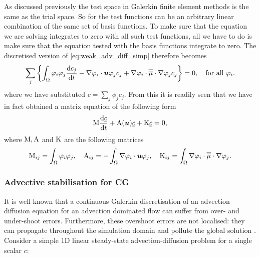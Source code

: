 As discussed previously the test space in Galerkin finite element methods is the same as the
trial space. So for \PN the test functions can be an arbitrary linear combination
of the same set of basis functions. To make sure that the equation we are solving
integrates to zero with all such test functions, all we have to do is make sure
that the equation tested with the basis functions integrate to zero. The discretised
version of \eqref{eq:weak_adv_diff_simp} therefore becomes
\begin{equation}
  \sum_j \left\{ \int_\Omega \varphi_i \varphi_j  \frac{\mathrm{d} c_j}{\mathrm{d} t} -
    \nabla\varphi_i\cdot{\mbox{\boldmath$u$}}\varphi_j  c_j +
    \nabla\varphi_i\cdot \overline{\overline{\mu}}\cdot\nabla \varphi_j c_j \right\} = 0,
    \quad\text{for all }\varphi_i.
\end{equation}
where we have substituted $c=\sum_j \phi_j c_j$. From this it is readily seen that
we have in fact obtained a matrix equation of the following form
\begin{equation}
  \mathrm{M} \frac{\mathrm{d}\underline{c}}{\mathrm{d} t}+\mathrm{A}({\mbox{\boldmath$u$}})\underline{c}+\mathrm{K}\underline{c}=0,
  \label{eq:cg_adv_diff_mat}
\end{equation}
where $\mathrm{M}, \mathrm{A}$ and $\mathrm{K}$ are the following matrices
\begin{equation}
  \mathrm{M}_{ij}=\int_\Omega \varphi_i\varphi_j, \quad
  \mathrm{A}_{ij}=-\int_\Omega \nabla\varphi_i\cdot{\mbox{\boldmath$u$}} \varphi_j, \quad
  \mathrm{K}_{ij}=\int_\Omega \nabla\varphi_i\cdot \overline{\overline{\mu}}\cdot\nabla \varphi_j.
\end{equation}

\subsubsection{Advective stabilisation for CG}
\label{Sect:ND_advective_stabilisation_CG}

It is well known that a continuous Galerkin discretisation of an
advection-diffusion equation for an advection dominated flow can suffer from
over- and under-shoot errors. Furthermore, these overshoot errors are not
localised: they can propagate throughout the simulation domain and pollute the
global solution \citep{hughes1987}. Consider a simple 1D linear steady-state
advection-diffusion problem for a single scalar $c$:

